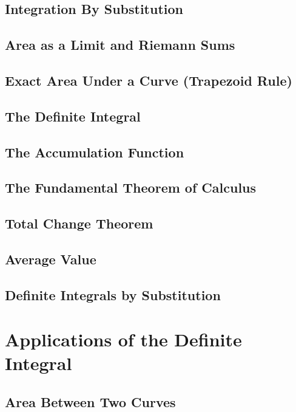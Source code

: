 \documentclass[letterpaper]{report}
\theoremstyle{definition}
\begin{document}
\section{Integration By Substitution}

\section{Area as a Limit and Riemann Sums}

\section{Exact Area Under a Curve (Trapezoid Rule)}

\section{The Definite Integral}

\section{The Accumulation Function}

\section{The Fundamental Theorem of Calculus}

\section{Total Change Theorem}

\section{Average Value}

\section{Definite Integrals by Substitution}


\chapter{Applications of the Definite Integral}

\section{Area Between Two Curves}
\end{document}
